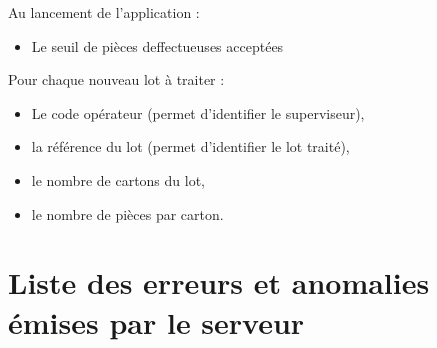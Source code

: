 Au lancement de l'application :\\
\begin{itemize}
	\item Le seuil de pièces deffectueuses acceptées
\end{itemize}

Pour chaque nouveau lot à traiter :\\
\begin{itemize}
	\item Le code opérateur (permet d'identifier le superviseur),
	\item la référence du lot (permet d'identifier le lot traité),
	\item le nombre de cartons du lot,
	\item le nombre de pièces par carton.
\end{itemize}

\section{Liste des erreurs et anomalies émises par le serveur}

